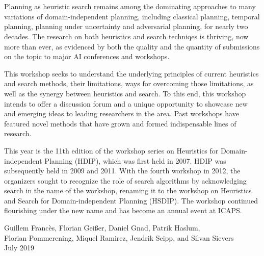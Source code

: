 \section*{}
Planning as heuristic search remains among the dominating approaches to many
variations of domain-independent planning, including classical planning,
temporal planning, planning under uncertainty and adversarial planning, for
nearly two decades. The research on both heuristics and search techniqes is
thriving, now more than ever, as evidenced by both the quality and the quantity
of submissions on the topic to major AI conferences and workshops.

This workshop seeks to understand the underlying principles of current
heuristics and search methods, their limitations, ways for overcoming those
limitations, as well as the synergy between heuristics and search. To this end,
this workshop intends to offer a discussion forum and a unique opportunity to
showcase new and emerging ideas to leading researchers in the area. Past
workshops have featured novel methods that have grown and formed indispensable
lines of research.

This year is the 11th edition of the workshop series on Heuristics for
Domain-independent Planning (HDIP), which was first held in 2007. HDIP
was subsequently held in 2009 and 2011. With the fourth workshop in
2012, the organizers sought to recognize the role of search algorithms
by acknowledging search in the name of the workshop, renaming it to
the workshop on Heuristics and Search for Domain-independent Planning
(HSDIP). The workshop continued flourishing under the new name and has
become an annual event at ICAPS.

\bigskip
\begin{flushright}
Guillem Franc\`es,
Florian Gei{\ss}er,
Daniel Gnad,
Patrik Haslum,\\
Florian Pommerening,
Miquel Ramirez,
Jendrik Seipp,
and Silvan Sievers
\\
July 2019
\end{flushright}

